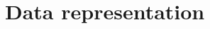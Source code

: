 \documentclass[../main.tex]{subfiles}
\begin{document}
\section{Data representation}
\label{sec:jgnn:data}
\end{document}
